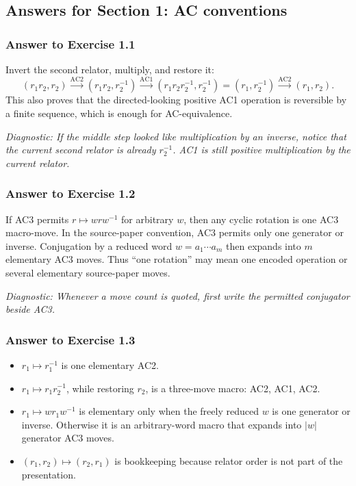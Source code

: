 \documentclass[11pt]{article}
\theoremstyle{definition}
\theoremstyle{remark}
\newcommand{\AC}{\mathrm{AC}}
\newcommand{\len}[1]{\left|#1\right|}
\newcommand{\diagnostic}[1]{\par\smallskip\textit{Diagnostic: #1}}
\begin{document}
\subsection*{Answers for Section 1: AC conventions}

\subsubsection*{Answer to Exercise 1.1}

Invert the second relator, multiply, and restore it:
\[
(r_1r_2,r_2)
\xrightarrow{\AC2}
(r_1r_2,r_2^{-1})
\xrightarrow{\AC1}
(r_1r_2r_2^{-1},r_2^{-1})
=(r_1,r_2^{-1})
\xrightarrow{\AC2}
(r_1,r_2).
\]
This also proves that the directed-looking positive AC1 operation is
reversible by a finite sequence, which is enough for AC-equivalence.

\diagnostic{If the middle step looked like multiplication by an inverse,
notice that the \emph{current} second relator is already \(r_2^{-1}\).  AC1
is still positive multiplication by the current relator.}

\subsubsection*{Answer to Exercise 1.2}

If AC3 permits \(r\mapsto w r w^{-1}\) for arbitrary \(w\), then any cyclic
rotation is one AC3 macro-move.  In the source-paper convention, AC3 permits
only one generator or inverse.  Conjugation by a reduced word
\(w=a_1\cdots a_m\) then expands into \(m\) elementary AC3 moves.  Thus
``one rotation'' may mean one encoded operation or several elementary
source-paper moves.

\diagnostic{Whenever a move count is quoted, first write the permitted
conjugator beside AC3.}

\subsubsection*{Answer to Exercise 1.3}

\begin{itemize}
  \item \(r_1\mapsto r_1^{-1}\) is one elementary AC2.
  \item \(r_1\mapsto r_1r_2^{-1}\), while restoring \(r_2\), is a
  three-move macro: AC2, AC1, AC2.
  \item \(r_1\mapsto w r_1w^{-1}\) is elementary only when the freely
  reduced \(w\) is one generator or inverse.  Otherwise it is an
  arbitrary-word macro that expands into \(\len{w}\) generator AC3 moves.
  \item \((r_1,r_2)\mapsto(r_2,r_1)\) is bookkeeping because relator order
  is not part of the presentation.
\end{itemize}
\end{document}
